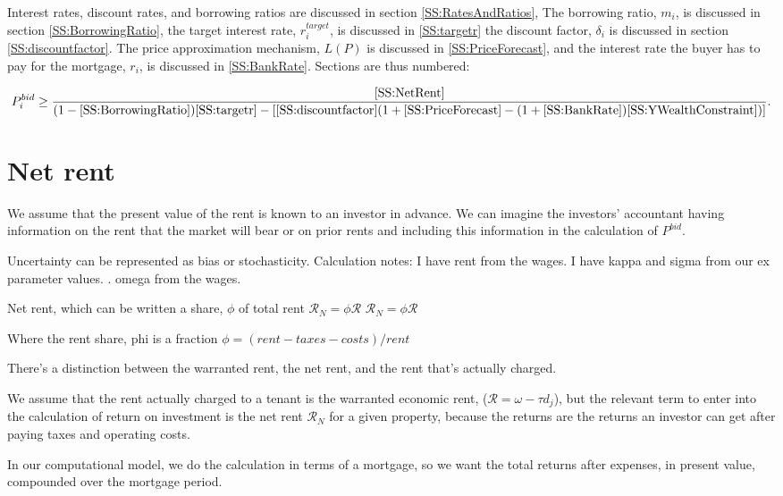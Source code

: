 Interest rates, discount rates, and borrowing ratios are discussed in section \ref{SS:RatesAndRatios},
The borrowing ratio, $m_i$, is discussed in section \ref{SS:BorrowingRatio}, the target interest rate, $r_i^{target}$, is discussed in \ref{SS:targetr} the discount factor, $\delta_i$ is discussed in section \ref{SS:discountfactor}. The price approximation mechanism, $L(P)$ is discussed in \ref{SS:PriceForecast}, and the interest rate the buyer has to pay for the mortgage, $r_i$, is discussed in \ref{SS:BankRate}. Sections are thus numbered: 

\begin{align*}
P_i^{bid} \ge   \frac{\ref{SS:NetRent}} {(1-\ref{SS:BorrowingRatio})\ref{SS:targetr}-
\left[ \ref{SS:discountfactor}(1+\ref{SS:PriceForecast}- (1+\ref{SS:BankRate})\ref{SS:YWealthConstraint})\right]}. 
\end{align*}



\section{Net rent}\label{SS:NetRent}
We assume that the present value of the rent %
is known to an investor in advance. We can imagine the investors' accountant having information on the rent that the market will bear or on prior rents and including this information in the calculation of $P^{bid}$.

Uncertainty can be represented as bias or stochasticity.
Calculation notes: I have rent from the wages. I have kappa and sigma from our ex parameter values. . omega from the wages. 

Net rent, which can be written a share, $\phi$ of total rent $\mathcal{R}_N = \phi \mathcal{R}$
$\mathcal{R}_N = \phi \mathcal{R}$

Where the \gls{rent share}, phi is a fraction
$\phi = (rent-taxes-costs) /rent$ 

There's a distinction between the warranted rent, the net rent, and the rent that's actually charged.

We assume that the  rent  actually charged to a tenant is the warranted economic rent, ($\mathcal{R}= \omega - \tau d_j$), but the relevant term to enter into the calculation of return on investment is the net rent $\mathcal{R}_N$ for a given property, because the returns are the returns an investor can get after paying taxes and operating costs.

In our computational model, we do the calculation in terms of a mortgage, so we want the total returns after expenses, in present value, compounded over the mortgage  period.

